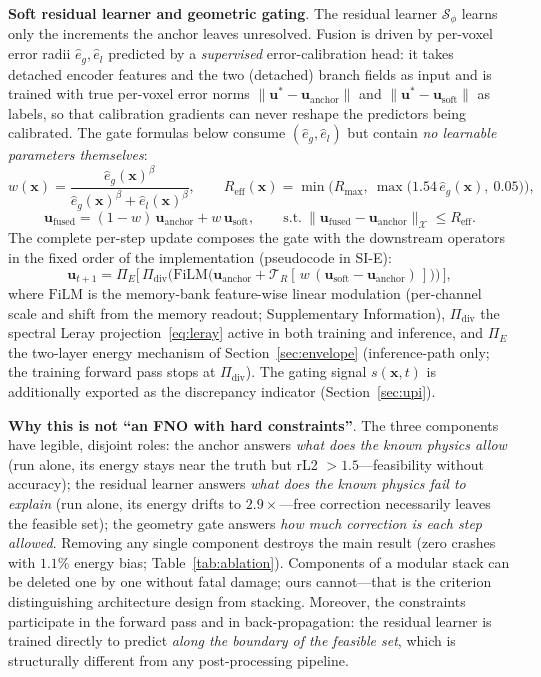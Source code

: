 \documentclass[11pt,a4paper]{article}
\newcommand{\bu}{\bm{u}}
\newcommand{\cS}{\mathcal{S}}
\newcommand{\cX}{\mathcal{X}}
\newcommand{\cT}{\mathcal{T}}
\begin{document}
\textbf{Soft residual learner and geometric gating}. The residual learner $\cS_\phi$ learns only the increments the anchor leaves unresolved. Fusion is driven by per-voxel error radii $\hat e_g,\hat e_l$ predicted by a \emph{supervised} error-calibration head: it takes detached encoder features and the two (detached) branch fields as input and is trained with true per-voxel error norms $\|\bu^*-\bu_{\mathrm{anchor}}\|$ and $\|\bu^*-\bu_{\mathrm{soft}}\|$ as labels, so that calibration gradients can never reshape the predictors being calibrated. The gate formulas below consume $(\hat e_g,\hat e_l)$ but contain \emph{no learnable parameters themselves}:
\begin{equation}
w(\bm{x})=\frac{\hat e_g(\bm{x})^{\beta}}{\hat e_g(\bm{x})^{\beta}+\hat e_l(\bm{x})^{\beta}},\qquad
R_{\mathrm{eff}}(\bm{x})=\min\!\Big(R_{\max},\ \max\big(1.54\,\hat e_g(\bm{x}),\ 0.05\big)\Big),
\label{eq:gate}
\end{equation}
\begin{equation}
\bu_{\mathrm{fused}}=(1-w)\,\bu_{\mathrm{anchor}}+w\,\bu_{\mathrm{soft}},\qquad
\text{s.t.}\ \|\bu_{\mathrm{fused}}-\bu_{\mathrm{anchor}}\|_{\cX}\le R_{\mathrm{eff}} .
\label{eq:fusion}
\end{equation}
The complete per-step update composes the gate with the downstream operators in the fixed order of the implementation (pseudocode in SI-E):
\begin{equation}
\bu_{t+1}=\Pi_{E}\!\Big[\,\Pi_{\mathrm{div}}\Big(\mathrm{FiLM}\big(\bu_{\mathrm{anchor}}+\cT_R[\,w\,(\bu_{\mathrm{soft}}-\bu_{\mathrm{anchor}})\,]\big)\Big)\,\Big],
\label{eq:update}
\end{equation}
where $\mathrm{FiLM}$ is the memory-bank feature-wise linear modulation (per-channel scale and shift from the memory readout; Supplementary Information), $\Pi_{\mathrm{div}}$ the spectral Leray projection~\eqref{eq:leray} active in both training and inference, and $\Pi_{E}$ the two-layer energy mechanism of Section~\ref{sec:envelope} (inference-path only; the training forward pass stops at $\Pi_{\mathrm{div}}$).
The gating signal $s(\bm{x},t)$ is additionally exported as the discrepancy indicator (Section~\ref{sec:upi}).

\textbf{Why this is not ``an FNO with hard constraints''}. The three components have legible, disjoint roles: the anchor answers \emph{what does the known physics allow} (run alone, its energy stays near the truth but rL2 $>1.5$---feasibility without accuracy); the residual learner answers \emph{what does the known physics fail to explain} (run alone, its energy drifts to $2.9\times$---free correction necessarily leaves the feasible set); the geometry gate answers \emph{how much correction is each step allowed}. Removing any single component destroys the main result (zero crashes with $1.1\%$ energy bias; Table~\ref{tab:ablation}). Components of a modular stack can be deleted one by one without fatal damage; ours cannot---that is the criterion distinguishing architecture design from stacking. Moreover, the constraints participate in the forward pass and in back-propagation: the residual learner is trained directly to predict \emph{along the boundary of the feasible set}, which is structurally different from any post-processing pipeline.
\end{document}
